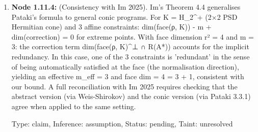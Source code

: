 \documentclass{article}
\begin{document}
\begin{enumerate}
\begin{enumerate}
  Type: claim, Inference: assumption, Status: pending, Taint: unresolved

\item \textbf{Node 1.11.4:} (Consistency with Im 2025). Im's Theorem 4.4 generalises Pataki's formula to general conic programs. For K = H\_2\textasciicircum{}+ (2×2 PSD Hermitian cone) and 3 affine constraints: dim(face(ρ, K)) - m + dim(correction) = 0 for extreme points. With face dimension r² = 4 and m = 3: the correction term dim(face(ρ, K)\textasciicircum{}⊥ ∩ R(A*)) accounts for the implicit redundancy. In this case, one of the 3 constraints is 'redundant' in the sense of being automatically satisfied at the face (the normalisation direction), yielding an effective m\_eff = 3 and face dim = 4 = 3 + 1, consistent with our bound. A full reconciliation with Im 2025 requires checking that the abstract version (via Weis-Shirokov) and the conic version (via Pataki 3.3.1) agree when applied to the same setting.

  Type: claim, Inference: assumption, Status: pending, Taint: unresolved

\end{enumerate}
\end{enumerate}
\end{document}
